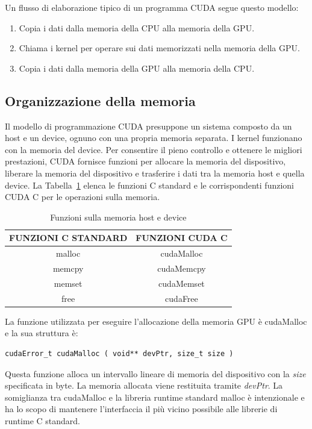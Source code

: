 Un flusso di elaborazione tipico di un programma CUDA segue questo modello:
\begin{enumerate}
	\item Copia i dati dalla memoria della CPU alla memoria della GPU.
	\item Chiama i kernel per operare sui dati memorizzati nella memoria della GPU.
	\item Copia i dati dalla memoria della GPU alla memoria della CPU.
\end{enumerate}
\subsection{Organizzazione della memoria}
\label{sec:managing_memory}
Il modello di programmazione CUDA presuppone un sistema composto da un host e un device, ognuno con una propria memoria separata. I kernel funzionano con la memoria del device. Per consentire il pieno controllo e ottenere le migliori prestazioni, CUDA fornisce funzioni per allocare la memoria del dispositivo, liberare la memoria del dispositivo e trasferire i dati tra la memoria host e quella device. La Tabella~\ref{table:Host and Device Memory Functions} elenca le funzioni C standard e le corrispondenti funzioni CUDA C per le operazioni sulla memoria.
\begin{table}[h!]
	\centering
	\begin{tabular}{c c} 
		\hline
		FUNZIONI C STANDARD & FUNZIONI CUDA C\\
		\hline
		malloc & cudaMalloc\\
		\hline
		memcpy & cudaMemcpy\\
		\hline
		memset & cudaMemset\\
		\hline
		free & cudaFree\\
		\hline
	\end{tabular}
	\caption{Funzioni sulla memoria host e device}
	\label{table:Host and Device Memory Functions}
\end{table}
La funzione utilizzata per eseguire l'allocazione della memoria GPU è cudaMalloc e la sua struttura è:
\begin{lstlisting}[label=code:cudaMalloc_def]
cudaError_t cudaMalloc ( void** devPtr, size_t size )
\end{lstlisting}
Questa funzione alloca un intervallo lineare di memoria del dispositivo con la \textit{size} specificata in byte. La memoria allocata viene restituita tramite \textit{devPtr}. La somiglianza tra cudaMalloc e la libreria runtime standard malloc è intenzionale e ha lo scopo di mantenere l'interfaccia il più vicino possibile alle librerie di runtime C standard.

